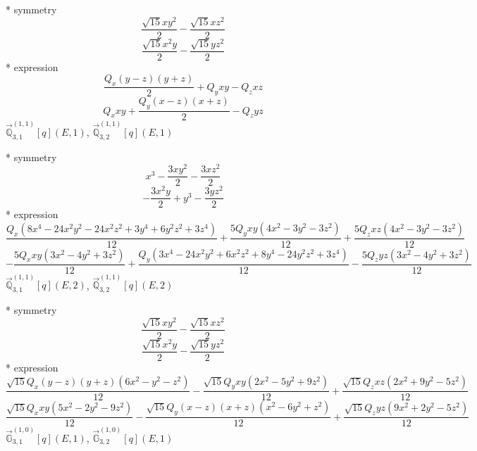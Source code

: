 \documentclass[fleqn,8pt]{jsarticle}
\begin{document}
\noindent\quad ** symmetry
\begin{dmath*}
\frac{\sqrt{15} x y^{2}}{2} - \frac{\sqrt{15} x z^{2}}{2}
\end{dmath*}
\begin{dmath*}
\frac{\sqrt{15} x^{2} y}{2} - \frac{\sqrt{15} y z^{2}}{2}
\end{dmath*}
\noindent\quad ** expression
\begin{dmath*}
\frac{Q_{x} \left(y - z\right) \left(y + z\right)}{2} + Q_{y} x y - Q_{z} x z
\end{dmath*}
\begin{dmath*}
Q_{x} x y + \frac{Q_{y} \left(x - z\right) \left(x + z\right)}{2} - Q_{z} y z
\end{dmath*}
\noindent\quad $\vec{\mathbb{Q}}_{3,1}^{(1,1)}[q](E,1)$, $\vec{\mathbb{Q}}_{3,2}^{(1,1)}[q](E,1)$

\noindent\quad ** symmetry
\begin{dmath*}
x^{3} - \frac{3 x y^{2}}{2} - \frac{3 x z^{2}}{2}
\end{dmath*}
\begin{dmath*}
- \frac{3 x^{2} y}{2} + y^{3} - \frac{3 y z^{2}}{2}
\end{dmath*}
\noindent\quad ** expression
\begin{dmath*}
\frac{Q_{x} \left(8 x^{4} - 24 x^{2} y^{2} - 24 x^{2} z^{2} + 3 y^{4} + 6 y^{2} z^{2} + 3 z^{4}\right)}{12} + \frac{5 Q_{y} x y \left(4 x^{2} - 3 y^{2} - 3 z^{2}\right)}{12} + \frac{5 Q_{z} x z \left(4 x^{2} - 3 y^{2} - 3 z^{2}\right)}{12}
\end{dmath*}
\begin{dmath*}
- \frac{5 Q_{x} x y \left(3 x^{2} - 4 y^{2} + 3 z^{2}\right)}{12} + \frac{Q_{y} \left(3 x^{4} - 24 x^{2} y^{2} + 6 x^{2} z^{2} + 8 y^{4} - 24 y^{2} z^{2} + 3 z^{4}\right)}{12} - \frac{5 Q_{z} y z \left(3 x^{2} - 4 y^{2} + 3 z^{2}\right)}{12}
\end{dmath*}
\noindent\quad $\vec{\mathbb{Q}}_{3,1}^{(1,1)}[q](E,2)$, $\vec{\mathbb{Q}}_{3,2}^{(1,1)}[q](E,2)$

\noindent\quad ** symmetry
\begin{dmath*}
\frac{\sqrt{15} x y^{2}}{2} - \frac{\sqrt{15} x z^{2}}{2}
\end{dmath*}
\begin{dmath*}
\frac{\sqrt{15} x^{2} y}{2} - \frac{\sqrt{15} y z^{2}}{2}
\end{dmath*}
\noindent\quad ** expression
\begin{dmath*}
\frac{\sqrt{15} Q_{x} \left(y - z\right) \left(y + z\right) \left(6 x^{2} - y^{2} - z^{2}\right)}{12} - \frac{\sqrt{15} Q_{y} x y \left(2 x^{2} - 5 y^{2} + 9 z^{2}\right)}{12} + \frac{\sqrt{15} Q_{z} x z \left(2 x^{2} + 9 y^{2} - 5 z^{2}\right)}{12}
\end{dmath*}
\begin{dmath*}
\frac{\sqrt{15} Q_{x} x y \left(5 x^{2} - 2 y^{2} - 9 z^{2}\right)}{12} - \frac{\sqrt{15} Q_{y} \left(x - z\right) \left(x + z\right) \left(x^{2} - 6 y^{2} + z^{2}\right)}{12} + \frac{\sqrt{15} Q_{z} y z \left(9 x^{2} + 2 y^{2} - 5 z^{2}\right)}{12}
\end{dmath*}
\noindent\quad $\vec{\mathbb{G}}_{3,1}^{(1,0)}[q](E,1)$, $\vec{\mathbb{G}}_{3,2}^{(1,0)}[q](E,1)$
\end{document}
